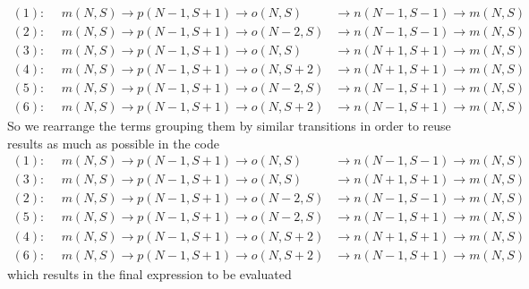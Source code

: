 \documentclass[12pt,a4paper]{scrartcl}
\numberwithin{equation}{section}
\begin{document}
\begin{align}
 (1): \ \  & m(N,S) \rightarrow p(N-1,S+1) \rightarrow o(N,S)    &\rightarrow n(N-1,S-1)  \rightarrow m(N,S) \nonumber \\
 (2): \ \  & m(N,S) \rightarrow p(N-1,S+1) \rightarrow o(N-2,S)  &\rightarrow n(N-1,S-1)  \rightarrow m(N,S) \nonumber\\
 (3): \ \  & m(N,S) \rightarrow p(N-1,S+1) \rightarrow o(N,S)    &\rightarrow n(N+1,S+1)  \rightarrow m(N,S) \nonumber\\
 (4): \ \  & m(N,S) \rightarrow p(N-1,S+1) \rightarrow o(N,S+2)  &\rightarrow n(N+1,S+1)  \rightarrow m(N,S) \nonumber\\
 (5): \ \  & m(N,S) \rightarrow p(N-1,S+1) \rightarrow o(N-2,S)  &\rightarrow n(N-1,S+1)  \rightarrow m(N,S) \nonumber\\
 (6): \ \  & m(N,S) \rightarrow p(N-1,S+1) \rightarrow o(N,S+2)  &\rightarrow n(N-1,S+1)  \rightarrow m(N,S) 
\end{align}
So we rearrange the terms grouping them by similar transitions in order to reuse results as much as possible in the code
\begin{align}
 (1): \ \  & m(N,S) \rightarrow p(N-1,S+1) \rightarrow o(N,S)    &\rightarrow n(N-1,S-1)  \rightarrow m(N,S) \nonumber \\
 (3): \ \  & m(N,S) \rightarrow p(N-1,S+1) \rightarrow o(N,S)    &\rightarrow n(N+1,S+1)  \rightarrow m(N,S) \nonumber\\
 (2): \ \  & m(N,S) \rightarrow p(N-1,S+1) \rightarrow o(N-2,S)  &\rightarrow n(N-1,S-1)  \rightarrow m(N,S) \nonumber\\
 (5): \ \  & m(N,S) \rightarrow p(N-1,S+1) \rightarrow o(N-2,S)  &\rightarrow n(N-1,S+1)  \rightarrow m(N,S) \nonumber\\
 (4): \ \  & m(N,S) \rightarrow p(N-1,S+1) \rightarrow o(N,S+2)  &\rightarrow n(N+1,S+1)  \rightarrow m(N,S) \nonumber\\
 (6): \ \  & m(N,S) \rightarrow p(N-1,S+1) \rightarrow o(N,S+2)  &\rightarrow n(N-1,S+1)  \rightarrow m(N,S) 
\end{align}
which results in the final expression to be evaluated
\end{document}
